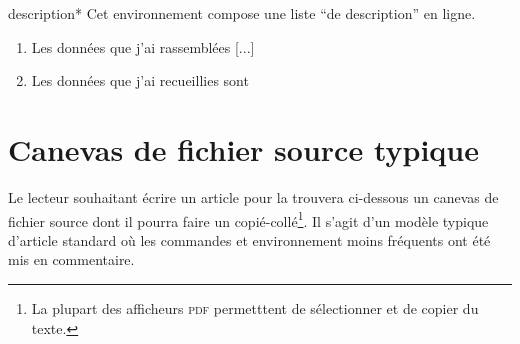 \begin{docEnvironment}[doclang/environment content=liste]{description*}{}
  Cet environnement compose une liste \enquote{de description} en ligne.
\end{docEnvironment}

\begin{bodycode}[listing and text,listing options={deletekeywords={[1]math,[2]url}}]
\begin{enumerate}
\item Les données que j’ai rassemblées [...]
\item Les données que j’ai recueillies sont
\end{enumerate}
\end{bodycode}

\section{Canevas de fichier source typique}
\label{sec-canevas-de-fichier}

Le lecteur souhaitant écrire un article pour la \gzt*{} trouvera ci-dessous un
canevas de fichier source dont il pourra faire un copié-collé\footnote{La
  plupart des afficheurs \textsc{pdf} permetttent de sélectionner et de copier
  du texte.}. Il s'agit d'un modèle typique d'article standard où les commandes
et environnement moins fréquents ont été mis en commentaire.


\iffalse
\fi
